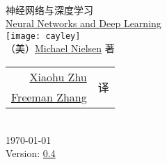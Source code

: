 
\begin{titlepage}
\begin{center}
  \hfill\\
  \vspace{1cm}
  {\fontsize{36pt}{40pt}\NotoSansSCBold{} 神经网络与深度学习}\\
  \vspace{1em}
  {\LARGE\RobotoRegular{} \href{http://neuralnetworksanddeeplearning.com/index.html}{Neural Networks and Deep Learning}}\\
  \vspace{1cm}
  \texttt{[image: cayley]}\\
  \vspace{1cm}
  {\LARGE （美）\href{http://michaelnielsen.org/}{Michael Nielsen} 著}\\
  \vspace{1cm}
  {\Large
    \begin{tabular}{rl}
      \href{mailto:xhzhu.nju@gmail}{Xiaohu Zhu} & \multirow{2}{*}{译} \\
      \href{mailto:zhanggyb@gmail.com}{Freeman Zhang} & \\
    \end{tabular}
  }\\
  \vfill
  {\large \today}\\
  \vspace{1em}
  {\large Version: \href{https://github.com/zhanggyb/nndl/releases/tag/0.4}{0.4}}
\end{center}
\end{titlepage}

